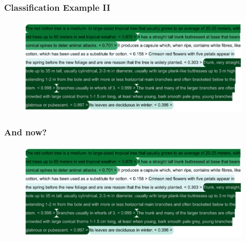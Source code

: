 \documentclass{beamer}
\begin{document}
\begin{frame}
\frametitle{Classification Example II}
\begin{figure} [htbp]
    \centering
    \includegraphics[width=\textwidth]{figures/web_crawler_example_sents_preds_2.pdf}
\end{figure}
\end{frame}



\begin{frame}
\frametitle{And now?}
\begin{figure} [htbp]
    \centering
    \includegraphics[width=\textwidth]{figures/web_crawler_example_sents_preds_2.pdf}
\end{figure}
\end{frame}
\end{document}
